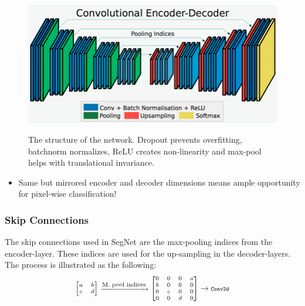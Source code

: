 \documentclass[
    ,title     = {{Image Segmentation for Smart Agriculture}}
    ,subject   = {{This is the subject of my work}}
    ,papersize = {{a1paper}}
    ,nocrop
]{dtuposter}
\begin{document}
\begin{dtupostercontent}
\begin{figure}
	\centering
	\includegraphics[width=0.9\linewidth]{Encoder-Decoder2}
	\caption{The structure of the network. Dropout prevents overfitting, batchnorm normalizes, ReLU creates non-linearity and max-pool helps with translational invariance.}
	\caption{}
	\label{fig:Structure}
\end{figure}

\begin{itemize}
	\item Same but mirrored encoder and decoder dimensions means ample opportunity for pixel-wise classification!
\end{itemize}
 
\subsubsection*{Skip Connections}
The skip connections used in SegNet are the max-pooling indices from the encoder-layer. These indices are used for the up-sampling in the decoder-layers. The process is illustrated as the following:
\begin{equation*}\label{key}
\scriptsize
\begin{bmatrix}a&b\\c&d\end{bmatrix} \xrightarrow{\text{\scriptsize M. pool indices}}
\begin{bmatrix}0&0&0&a\\b&0&0&0\\0&c&0&0\\0&0&d&0\end{bmatrix} 
\rightarrow 
\texttt{\scriptsize Conv2d}
\end{equation*}


\end{dtupostercontent}
\end{document}
